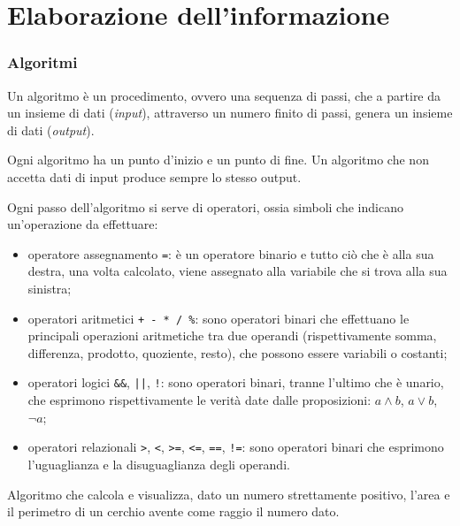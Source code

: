 \part{Elaborazione dell'informazione}

\section{Algoritmi}

Un algoritmo è un procedimento, ovvero una sequenza di passi, che a partire da un insieme di dati (\emph{input}), attraverso un numero finito di passi, genera un insieme di dati (\emph{output}).

Ogni algoritmo ha un punto d'inizio e un punto di fine.
Un algoritmo che non accetta dati di input produce sempre lo stesso output.

Ogni passo dell'algoritmo si serve di operatori, ossia simboli che indicano un'operazione da effettuare:
\begin{itemize}
  \item operatore assegnamento \verb|=|: è un operatore binario e tutto ciò che è alla sua destra, una volta calcolato, viene assegnato alla variabile che si trova alla sua sinistra;
  \item operatori aritmetici \verb|+ - * / %|: sono operatori binari che effettuano le principali operazioni aritmetiche tra due operandi (rispettivamente somma, differenza, prodotto, quoziente, resto), che possono essere variabili o costanti;
  \item operatori logici \verb|&&|, \verb!||!, \verb|!|: sono operatori binari, tranne l'ultimo che è unario, che esprimono rispettivamente le verità date dalle proposizioni: $a\wedge b$, $a\vee b$, $\lnot a$;
  \item operatori relazionali \verb|>|, \verb|<|, \verb|>=|, \verb|<=|, \verb|==|, \verb|!=|: sono operatori binari che esprimono l'uguaglianza e la disuguaglianza degli operandi. 
\end{itemize}

\begin{example}
  Algoritmo che calcola e visualizza, dato un numero strettamente positivo, l'area e il perimetro di un cerchio avente come raggio il numero dato.
  \begin{center}
  \end{center}
\end{example}

